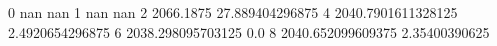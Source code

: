 0 nan nan
1 nan nan
2 2066.1875 27.889404296875
4 2040.7901611328125 2.4920654296875
6 2038.298095703125 0.0
8 2040.652099609375 2.35400390625
